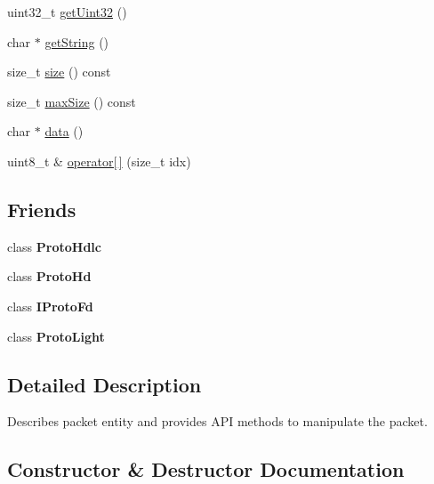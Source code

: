 \begin{DoxyCompactItemize}
uint32\+\_\+t \hyperlink{classTiny_1_1IPacket_a0a0d3758ca0f61e3eee9d20a7142de8d}{get\+Uint32} ()
\item 
char $\ast$ \hyperlink{classTiny_1_1IPacket_ac6e6a22ce9a652954491a8d4db081d79}{get\+String} ()
\item 
size\+\_\+t \hyperlink{classTiny_1_1IPacket_a76b6389f0d47b67c8428c58c2b09df51}{size} () const
\item 
size\+\_\+t \hyperlink{classTiny_1_1IPacket_a0a448d8efe2b6db3ee826f23b184b395}{max\+Size} () const
\item 
char $\ast$ \hyperlink{classTiny_1_1IPacket_aedf2ba31c5a29e3829458bd9f03a7051}{data} ()
\item 
uint8\+\_\+t \& \hyperlink{classTiny_1_1IPacket_aa1d796806e21d1c72a1fc12d2f6db592}{operator\mbox{[}$\,$\mbox{]}} (size\+\_\+t idx)
\end{DoxyCompactItemize}
\subsection*{Friends}
\begin{DoxyCompactItemize}
\item 
\mbox{\label{classTiny_1_1IPacket_aa98e64c7cbec336d31f68722ad385bb9}} 
class {\bfseries Proto\+Hdlc}
\item 
\mbox{\label{classTiny_1_1IPacket_a7f90e063a34c3417ed1ea25e64608857}} 
class {\bfseries Proto\+Hd}
\item 
\mbox{\label{classTiny_1_1IPacket_acb64e0550d8886dc8b8b5f1393667578}} 
class {\bfseries I\+Proto\+Fd}
\item 
\mbox{\label{classTiny_1_1IPacket_a1d317236f2a79fa559d5a9112e555882}} 
class {\bfseries Proto\+Light}
\end{DoxyCompactItemize}


\subsection{Detailed Description}
Describes packet entity and provides A\+PI methods to manipulate the packet. 

\subsection{Constructor \& Destructor Documentation}
\mbox{\label{classTiny_1_1IPacket_af44b18c4c8481475d40d8b87a6cb38ff}} 
